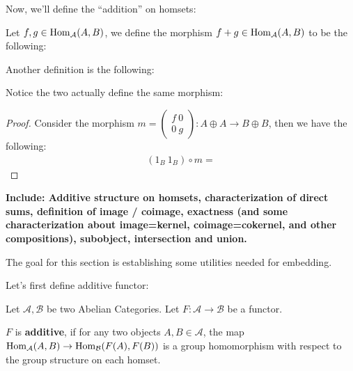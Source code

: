 \documentclass{article}
\begin{document}
\hfil

Now, we'll define the ``addition'' on homsets:
\begin{defn}
    Let $f,g\in \mathrm{Hom}_\mathcal{A}(A,B)$, we define the morphism $f+g\in \mathrm{Hom}_\mathcal{A}(A,B)$ to be the following:
    \begin{center}
    \end{center}
    Another definition is the following:
    \begin{center}
    \end{center}
\end{defn}
Notice the two actually define the same morphism:

\begin{proof}
    Consider the morphism $m=\begin{pmatrix}
        f\ 0\\0\ g
    \end{pmatrix}:A\oplus A\rightarrow B\oplus B$, then we have the following:
    \begin{align}
        (1_B\ 1_B)\circ m= 
    \end{align}
\end{proof}

\textbf{Include: Additive structure on homsets, characterization of direct sums, definition of image / coimage, exactness (and some characterization about image=kernel, coimage=cokernel, and other compositions), subobject, intersection and union.}

\hfil

The goal for this section is establishing some utilities needed for embedding.

Let's first define additive functor:
\begin{defn}
    Let $\mathcal{A},\mathcal{B}$ be two Abelian Categories. Let $F:\mathcal{A}\rightarrow\mathcal{B}$ be a functor. 
    
    $F$ is \textbf{additive}, if for any two objects $A,B\in \mathcal{A}$, the map $\mathrm{Hom}_\mathcal{A}(A,B)\rightarrow \mathrm{Hom}_\mathcal{B}(F(A),F(B))$ is a group homomorphism with respect to the group structure on each homset.
\end{defn}
\end{document}
